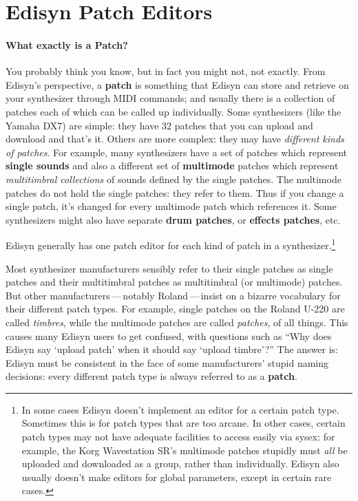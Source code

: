 \documentclass{article}
\begin{document}
\section{Edisyn Patch Editors}

\paragraph{What exactly is a Patch?}  You probably think you know, but in fact you might not, not exactly.  From Edisyn's perspective, a {\bf patch} is something that Edisyn can store and retrieve on your synthesizer through MIDI commands; and usually there is a collection of patches each of which can be called up individually.  Some synthesizers (like the Yamaha DX7) are simple: they have 32 patches that you can upload and download and that's it.  Others are more complex: they may have {\it different kinds of patches}.  For example, many synthesizers have a set of patches which represent {\bf single sounds} and also a different set of {\bf multimode} patches which represent {\it multitimbral collections} of sounds defined by the single patches.  The multimode patches do not hold the single patches: they refer to them.  Thus if you change a single patch, it's changed for every multimode patch which references it.  Some synthesizers might also have separate {\bf drum patches}, or {\bf effects patches}, etc.

Edisyn generally has one patch editor for each kind of patch in a synthesizer.\footnote{In some cases Edisyn doesn't implement an editor for a certain patch type.  Sometimes this is for patch types that are too arcane.  In other cases, certain patch types may not have adequate facilities to access easily via sysex: for example, the Korg Wavestation SR's multimode patches stupidly must {\it all} be uploaded and downloaded as a group, rather than individually.  Edisyn also usually doesn't make editors for global parameters, except in certain rare cases.}

Most synthesizer manufacturers sensibly refer to their single patches as single patches and their multitimbral patches as multitimbral (or multimode) patches.  But other manufacturers\,---\,notably Roland\,---\,insist on a bizarre vocabulary for their different patch types.  For example, single patches on the Roland U-220 are called {\it timbres}, while the multimode patches are called {\it patches}, of all things.  This causes many Edisyn users to get confused, with questions such as ``Why does Edisyn say `upload patch' when it should say `upload timbre'?''  The answer is: Edisyn must be consistent in the face of some manufacturers' stupid naming decisions: every different patch type is always referred to as a {\bf patch}.
\end{document}
